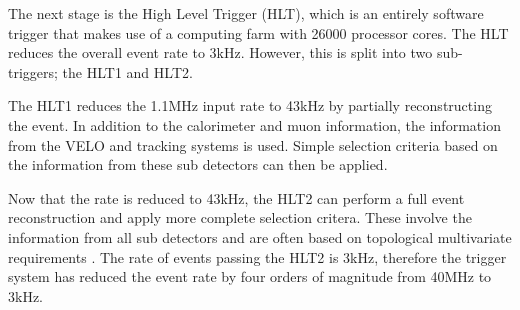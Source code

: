 The next stage is the High Level Trigger (HLT), which is an entirely software trigger that makes use of a computing farm with 26000 processor cores.  The HLT reduces the overall event rate to 3kHz.  However, this is split into two sub-triggers; the HLT1 and HLT2.

The HLT1 reduces the 1.1MHz input rate to 43kHz by partially reconstructing the event.  In addition to the calorimeter and muon information, the information from the VELO and tracking systems is used.  Simple selection criteria based on the information from these sub detectors can then be applied.

Now that the rate is reduced to 43kHz, the HLT2 can perform a full event reconstruction and apply more complete selection critera.  These involve the information from all sub detectors and are often based on topological multivariate requirements \cite{BBDT}.  The rate of events passing the HLT2 is 3kHz, therefore the \lhcb trigger system has reduced the event rate by four orders of magnitude from 40MHz to 3kHz.


\clearpage
